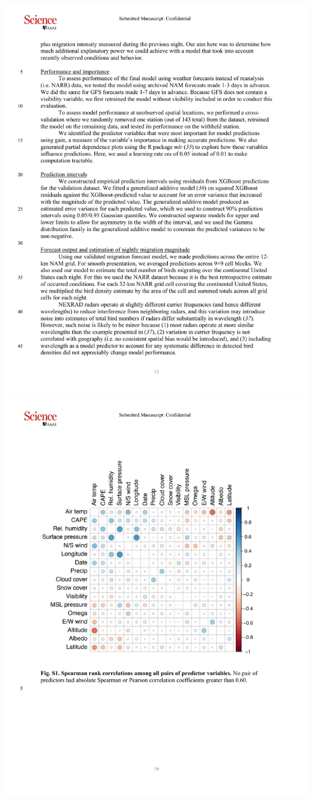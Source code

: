 \documentclass[a4paper, twoside]{templates/ociamthesis}
\begin{document}
\includegraphics[width=1\linewidth]{pdf_chapters/forecast/forecast_supp_crop_Part05}
\includegraphics[width=1\linewidth]{pdf_chapters/forecast/forecast_supp_crop_Part06}
\end{document}
